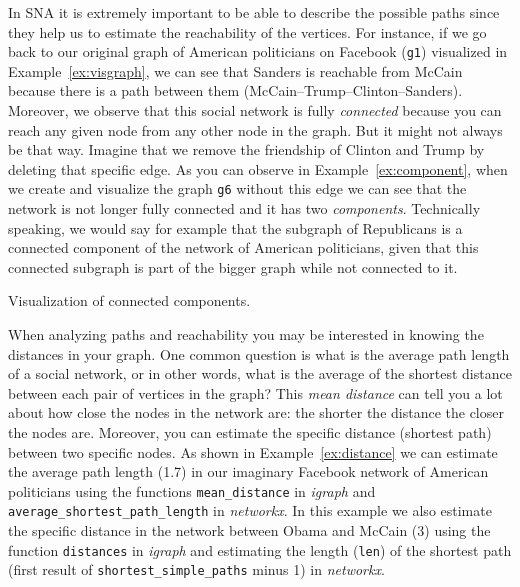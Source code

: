 In SNA it is extremely important to be able to describe the possible paths since they help us to estimate the reachability of the vertices. For instance, if we go back to our original graph of American politicians on Facebook (\texttt{g1}) visualized in Example~\ref{ex:visgraph}, we can see that Sanders is reachable from McCain because there is a path between them (McCain--Trump--Clinton--Sanders).  Moreover, we observe that this social network is fully \emph{connected} because you can reach any given node from any other node in the graph. But it might not always be that way. Imagine that we remove the friendship of Clinton and Trump by deleting that specific edge. As you can observe in Example~\ref{ex:component}, when we create and visualize the graph \texttt{g6} without this edge we can see that the network is not longer fully connected and it has two \emph{components}. Technically speaking, we would say for example that the subgraph of Republicans is a connected component of the network of American politicians, given that this connected subgraph is part of the bigger graph while not connected to it.

\begin{ccsexample}
  \caption{Visualization of connected components.}
  \label{ex:component}
\end{ccsexample}

When analyzing paths and reachability you may be interested in knowing the distances in your graph. One common question is what is the average path length of a social network, or in other words, what is the average of the shortest distance between each pair of vertices in the graph? This \emph{mean distance} can tell you a lot about how close the nodes in the network are: the shorter the distance the closer the nodes are. Moreover, you can estimate the specific distance (shortest path) between two specific nodes.  As shown in Example~\ref{ex:distance} we can estimate the average path length (1.7) in our imaginary Facebook network of American politicians using the functions \texttt{mean\_distance} in \emph{igraph} and \texttt{average\_shortest\_path\_length} in \emph{networkx}. In this example we also estimate the specific distance in the network between Obama and McCain (3) using the function \texttt{distances} in \emph{igraph} and estimating the length (\texttt{len}) of the shortest path (first result of \texttt{shortest\_simple\_paths} minus 1) in \emph{networkx}.

